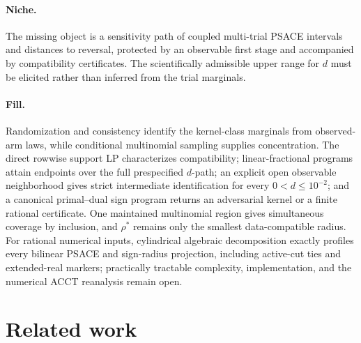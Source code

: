 \documentclass{article}
\begin{document}
\paragraph{Niche.} The missing object is a sensitivity path of coupled multi-trial PSACE intervals and distances to reversal, protected by an observable first stage and accompanied by compatibility certificates. The scientifically admissible upper range for \(d\) must be elicited rather than inferred from the trial marginals.

\paragraph{Fill.} Randomization and consistency identify the kernel-class marginals from observed-arm laws, while conditional multinomial sampling supplies concentration. The direct rowwise support LP characterizes compatibility; linear-fractional programs attain endpoints over the full prespecified \(d\)-path; an explicit open observable neighborhood gives strict intermediate identification for every \(0<d\le10^{-2}\); and a canonical primal--dual sign program returns an adversarial kernel or a finite rational certificate. One maintained multinomial region gives simultaneous coverage by inclusion, and \(\rho^*\) remains only the smallest data-compatible radius. For rational numerical inputs, cylindrical algebraic decomposition exactly profiles every bilinear PSACE and sign-radius projection, including active-cut ties and extended-real markers; practically tractable complexity, implementation, and the numerical ACCT reanalysis remain open.

\section{Related work}
\end{document}
